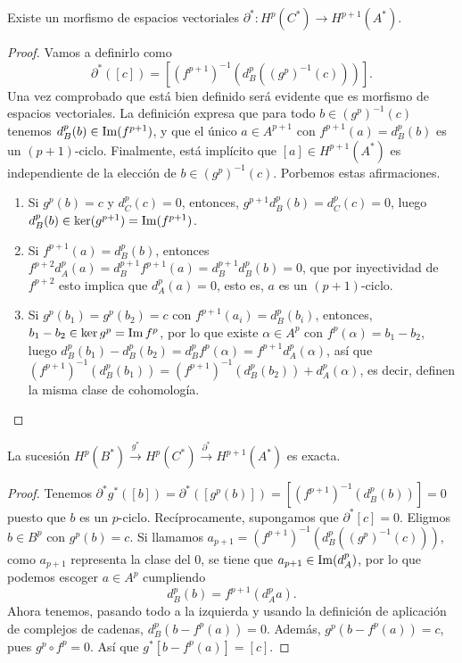 \documentclass[CV.tex]{subfiles}
\begin{document}
\begin{lemma}\label{lema2}
Existe un morfismo de espacios vectoriales $\partial^*:H^p(C^*)\to H^{p+1}(A^*)$. 
\end{lemma}
\begin{proof}
Vamos a definirlo como
\[
\partial^*([c])=[(f^{p+1})^{-1}(d^p_B((g^p)^{-1}(c)))].
\]
Una vez comprobado que está bien definido será evidente que es morfismo de espacios vectoriales. La definición expresa que para todo $b\in (g^{p})^{-1}(c)$ tenemos $d^p_B(b)\in \operatorname{Im}(f^{p+1})$, y que el único $a\in A^{p+1}$ con $f^{p+1}(a)=d^p_B(b)$ es un $(p+1)$-ciclo. Finalmente, está implícito que $[a]\in H^{p+1}(A^*)$ es independiente de la elección de $b\in (g^p)^{-1}(c)$. Porbemos estas afirmaciones.
\begin{enumerate}[i]
\item Si $g^p(b)=c$ y $d_C^p(c)=0$, entonces, $g^{p+1}d_B^p(b)=d_C^p(c)=0$, luego $d_B^p(b)\in\ker(g^{p+1})=\operatorname{Im}(f^{p+1})$.
\item Si $f^{p+1}(a)=d^p_B(b)$, entonces $f^{p+2}d_A^p(a)=d_B^{p+1}f^{p+1}(a)=d_B^{p+1}d^p_B(b)=0$, que por inyectividad de $f^{p+2}$ esto implica que $d_A^p(a)=0$, esto es, $a$ es un $(p+1)$-ciclo.
\item Si $g^p(b_1)=g^p(b_2)=c$ con $f^{p+1}(a_i)=d_B^p(b_i)$, entonces, $b_1-b_2\in\ker{g^p}=\operatorname{Im}{f^p}$, por lo que existe $\alpha\in A^p$ con $f^p(\alpha)=b_1-b_2$, luego $d_B^p(b_1)-d_B^p(b_2)=d_B^pf^p(\alpha)=f^{p+1}d_A^p(\alpha)$, así que $(f^{p+1})^{-1}(d_B^p(b_1))=(f^{p+1})^{-1}(d_B^p(b_2))+d_A^p(\alpha)$, es decir, definen la misma clase de cohomología.
\end{enumerate}
\end{proof}

\begin{lemma}\label{lema3}
La sucesión $H^p(B^*)\overset{g^*}{\to}H^p(C^*)\overset{\partial^*}{\to} H^{p+1}(A^*)$ es exacta.
\end{lemma}
\begin{proof}
Tenemos $\partial^*g^*([b])=\partial^*([g^p(b)])=[(f^{p+1})^{-1}(d_B^p(b))]=0$ puesto que $b$ es un $p$-ciclo. Recíprocamente, supongamos que $\partial^*[c]=0$. Eligmos $b\in B^p$ con $g^p(b)=c$. Si llamamos $a_{p+1}=(f^{p+1})^{-1}(d_B^p((g^p)^{-1}(c)))$, como $a_{p+1}$ representa la clase del 0, se tiene que $a_{p+1}\in\operatorname{Im}(d_A^p)$, por lo que podemos escoger $a\in A^p$ cumpliendo
\[
d_B^p(b)=f^{p+1}(d_A^pa).
\]
Ahora tenemos, pasando todo a la izquierda y usando la definición de aplicación de complejos de cadenas, $d_B^p(b-f^p(a))=0$. Además, $g^p(b-f^p(a))=c$, pues $g^p\circ f^p=0$. Así que $g^*[ b-f^p(a)]=[c]$. 
\end{proof}
\end{document}
